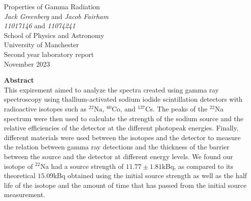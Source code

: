 \documentclass[11pt]{article} %
\begin{document}


\begin{titlepage} %
\begin{center} %

{\Huge Properties of Gamma Radiation}\\[0.5cm] %
\textit{Jack Greenberg} and \textit{Jacob Fairham}~\\[0.3cm] %
\textit{11017146} and \textit{11074241}~\\[0.3cm]
School of Physics and Astronomy~\\[0.3cm]
University of Manchester~\\[0.3cm]
Second year laboratory report~\\[0.3cm]
November 2023~\\[2cm]


\end{center}
{\Large \textbf{Abstract}}~\\[0.3cm]
 This expirement aimed to analyze the spectra created using gamma ray spectroscopy using thallium-activated sodium iodide scintillation detectors with radioactive isotopes such as $^{22}$Na, $^{60}$Co, and $^{137}$Cs. The peaks of the $^{22}$Na spectrum were then used to calculate the strength of the sodium source and the relative efficiencies of the detector at the different photopeak energies. Finally, different materials were used between the isotopes and the detector to measure the relation between gamma ray detections and the thickness of the barrier between the source and the detector at different energy levels. We found our isotope of $^{22}$Na had a source strength of $11.77\pm1.81$kBq, as compared to its theoretical $15.09$kBq obtained using the initial source strength as well as the half life of the isotope and the amount of time that has passed from the initial source measurement.

\end{titlepage}
\clearpage
{} %
\setcounter{page}{2} %
\end{document}
